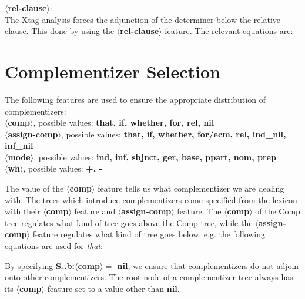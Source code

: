 {\bf $\langle$rel-clause$\rangle$}:\\
The Xtag analysis forces the adjunction of the determiner 
below the relative clause. This done by using the {\bf $\langle$rel-clause$\rangle$}
feature. The relevant equations are:





\section{Complementizer Selection}
The following features are used to ensure the appropriate distribution
of complementizers:
\\
{\bf $\langle$comp$\rangle$}, possible values: {\bf that, if, whether, for, rel, nil}\\
{\bf $\langle$assign-comp$\rangle$}, possible values: {\bf that, if, whether, for/ecm, 
rel, ind\_nil, inf\_nil}\\
{\bf $\langle$mode$\rangle$}, possible values: {\bf ind, inf, sbjnct, ger, base, ppart, 
nom, prep}\\
{\bf $\langle$wh$\rangle$}, possible values: {\bf +, -}

The value of the {\bf $\langle$comp$\rangle$} feature tells us what complementizer we 
are dealing with. The trees which introduce complementizers come 
specified from the lexicon with their 
{\bf $\langle$comp$\rangle$} feature and {\bf $\langle$assign-comp$\rangle$} 
feature. The {\bf $\langle$comp$\rangle$} of the Comp tree regulates 
what kind of tree goes above the Comp tree, while the 
{\bf $\langle$assign-comp$\rangle$} feature regulates what kind of tree
goes below.
e.g.
the following equations are used for {\em that}:


By specifying {\bf S$_{r}$.b:$\langle$comp$\rangle =$ nil}, we ensure that
complementizers do not adjoin onto other complementizers. The root node
of a complementizer tree always has its {\bf $\langle$comp$\rangle$} feature
set to a value other than {\bf nil}.


